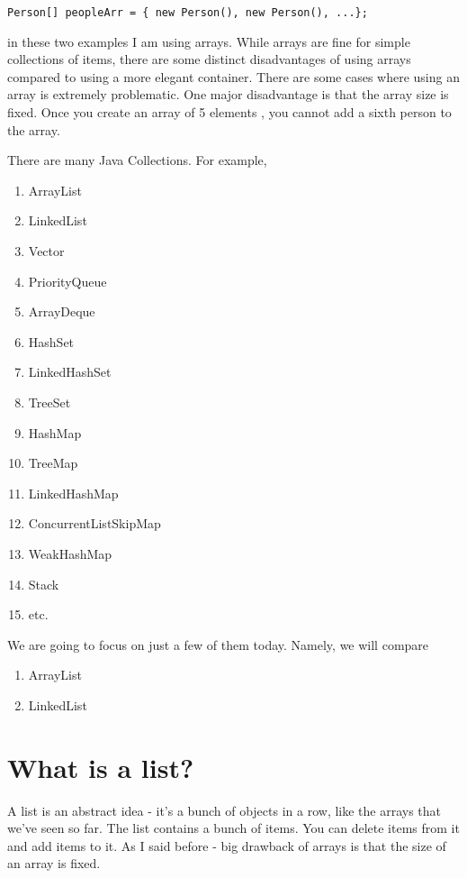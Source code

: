 \documentclass[12pt]{article}
\begin{document}
\begin{lstlisting}
Person[] peopleArr = { new Person(), new Person(), ...};
\end{lstlisting}

in these two examples I am using arrays. While arrays are fine for simple collections of items, there are some distinct disadvantages of using arrays compared to using a more elegant container. There are some cases where using an array is extremely problematic. One major disadvantage is that the array size is fixed. Once you create an array of 5  elements , you cannot add a sixth person to the array.  

There are many Java Collections. For example, 

\begin{enumerate}
\item ArrayList
\item LinkedList
\item Vector
\item PriorityQueue
\item ArrayDeque
\item HashSet
\item LinkedHashSet
\item TreeSet
\item HashMap
\item TreeMap
\item LinkedHashMap
\item ConcurrentListSkipMap
\item WeakHashMap
\item Stack
\item etc.
\end{enumerate}

We are going to focus on just a few of them today. Namely, we will compare

\begin{enumerate}
\item ArrayList
\item LinkedList
\end{enumerate}

\section{What is a list?}
A list is an abstract idea - it's a bunch of objects in a row, like the arrays that we've seen so far. The list contains a bunch of items. You can delete items from it and add items to it. As I said before - big drawback of arrays is that the size of an array is fixed.
\end{document}

